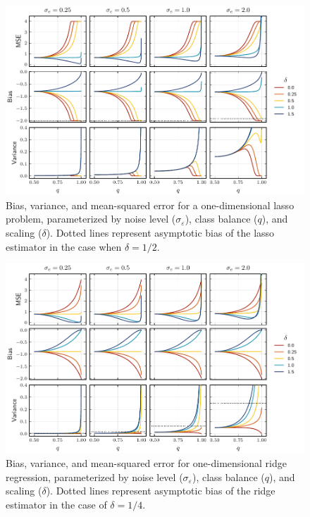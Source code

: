 \begin{figure}[htpb]
  \centering
  \includegraphics[]{plots/binary_onedim_bias_var_lasso.pdf}
  \caption{%
    Bias, variance, and mean-squared error for a one-dimensional lasso problem,
    parameterized by noise level (\(\sigma_\varepsilon\)), class balance (\(q\)), and
    scaling (\(\delta\)). Dotted lines represent asymptotic bias of the lasso
    estimator in the case when \(\delta = 1/2\).}
  \label{fig:bias-var-onedim-lasso}
\end{figure}

\begin{figure}[htpb]
  \centering
  \includegraphics[]{plots/binary_onedim_bias_var_ridge.pdf}
  \caption{%
    Bias, variance, and mean-squared error for one-dimensional ridge regression,
    parameterized by noise level (\(\sigma_\varepsilon\)), class balance (\(q\)), and
    scaling (\(\delta\)). Dotted lines represent asymptotic bias of the ridge
    estimator in the case of \(\delta = 1/4\).}
  \label{fig:bias-var-onedim-ridge}
\end{figure}

